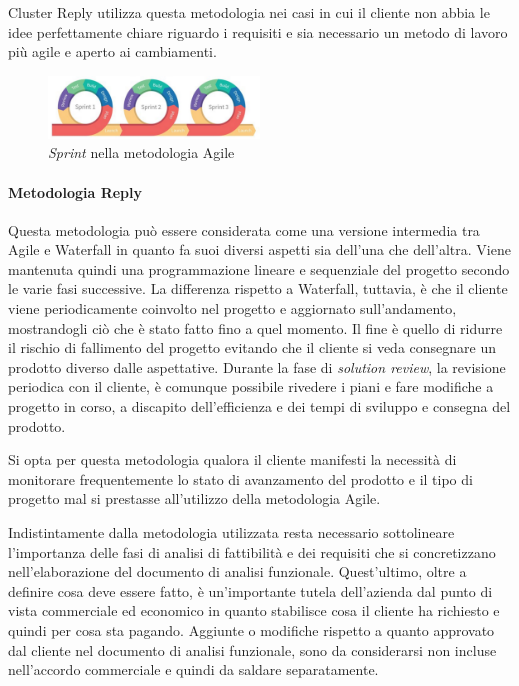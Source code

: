 Cluster Reply utilizza questa metodologia nei casi in cui il cliente non abbia le idee perfettamente chiare riguardo i requisiti e sia necessario un metodo di lavoro più agile e aperto ai cambiamenti.

\begin{figure}[ht]
  \centering
  \includegraphics[width=0.50\textwidth]{agile.png}
  \caption{\textit{Sprint} nella metodologia Agile}
  \label{fig:sprintAgile}
\end{figure}

\paragraph{Metodologia Reply} Questa metodologia può essere considerata come una versione intermedia tra Agile e Waterfall in quanto fa suoi diversi aspetti sia dell'una che dell'altra. Viene mantenuta quindi una programmazione lineare e sequenziale del progetto secondo le varie fasi successive. La differenza rispetto a Waterfall, tuttavia, è che il cliente viene periodicamente coinvolto nel progetto e aggiornato sull'andamento, mostrandogli ciò che è stato fatto fino a quel momento. Il fine è quello di ridurre il rischio di fallimento del progetto evitando che il cliente si veda consegnare un prodotto diverso dalle aspettative. Durante la fase di \textit{solution review}, la revisione periodica con il cliente, è comunque possibile rivedere i piani e fare modifiche a progetto in corso, a discapito dell'efficienza e dei tempi di sviluppo e consegna del prodotto.

Si opta per questa metodologia qualora il cliente manifesti la necessità di monitorare frequentemente lo stato di avanzamento del prodotto e il tipo di progetto mal si prestasse all'utilizzo della metodologia Agile.

\setlength{\parskip}{2em}
Indistintamente dalla metodologia utilizzata resta necessario sottolineare l'importanza delle fasi di analisi di fattibilità e dei requisiti che si concretizzano nell'elaborazione del documento di analisi funzionale. Quest'ultimo, oltre a definire cosa deve essere fatto, è un'importante tutela dell'azienda dal punto di vista commerciale ed economico in quanto stabilisce cosa il cliente ha richiesto e quindi per cosa sta pagando. Aggiunte o modifiche rispetto a quanto approvato dal cliente nel documento di analisi funzionale, sono da considerarsi non incluse nell'accordo commerciale e quindi da saldare separatamente.
\setlength{\parskip}{0em}

